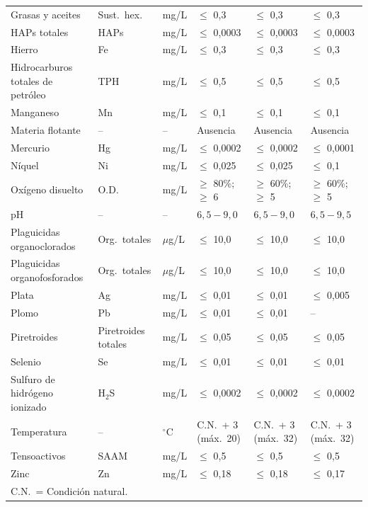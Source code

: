 \documentclass[12pt,a4paper]{article}
\begin{document}
\begin{longtable}{p{4.0cm}p{1.8cm}p{1.2cm}p{2.5cm}p{2.5cm}p{2.5cm}}
Grasas y aceites & Sust.\ hex. & mg/L & $\leq$ 0,3 & $\leq$ 0,3 & $\leq$ 0,3 \\
HAPs totales & HAPs & mg/L & $\leq$ 0,0003 & $\leq$ 0,0003 & $\leq$ 0,0003 \\
Hierro & Fe & mg/L & $\leq$ 0,3 & $\leq$ 0,3 & $\leq$ 0,3 \\
Hidrocarburos totales de petr\'oleo & TPH & mg/L & $\leq$ 0,5 & $\leq$ 0,5 & $\leq$ 0,5 \\
Manganeso & Mn & mg/L & $\leq$ 0,1 & $\leq$ 0,1 & $\leq$ 0,1 \\
Materia flotante & -- & -- & Ausencia & Ausencia & Ausencia \\
Mercurio & Hg & mg/L & $\leq$ 0,0002 & $\leq$ 0,0002 & $\leq$ 0,0001 \\
N\'iquel & Ni & mg/L & $\leq$ 0,025 & $\leq$ 0,025 & $\leq$ 0,1 \\
Ox\'igeno disuelto & O.D. & mg/L & $\geq$ 80\%; $\geq$ 6 & $\geq$ 60\%; $\geq$ 5 & $\geq$ 60\%; $\geq$ 5 \\
pH & -- & -- & $6,5 - 9,0$ & $6,5 - 9,0$ & $6,5 - 9,5$ \\
Plaguicidas organoclorados & Org.\ totales & $\mu$g/L & $\leq$ 10,0 & $\leq$ 10,0 & $\leq$ 10,0 \\
Plaguicidas organofosforados & Org.\ totales & $\mu$g/L & $\leq$ 10,0 & $\leq$ 10,0 & $\leq$ 10,0 \\
Plata & Ag & mg/L & $\leq$ 0,01 & $\leq$ 0,01 & $\leq$ 0,005 \\
Plomo & Pb & mg/L & $\leq$ 0,01 & $\leq$ 0,01 & -- \\
Piretroides & Piretroides totales & mg/L & $\leq$ 0,05 & $\leq$ 0,05 & $\leq$ 0,05 \\
Selenio & Se & mg/L & $\leq$ 0,01 & $\leq$ 0,01 & $\leq$ 0,01 \\
Sulfuro de hidr\'ogeno ionizado & H$_2$S & mg/L & $\leq$ 0,0002 & $\leq$ 0,0002 & $\leq$ 0,0002 \\
Temperatura & -- & $^\circ$C & C.N.\ + 3 (m\'ax.\ 20) & C.N.\ + 3 (m\'ax.\ 32) & C.N.\ + 3 (m\'ax.\ 32) \\
Tensoactivos & SAAM & mg/L & $\leq$ 0,5 & $\leq$ 0,5 & $\leq$ 0,5 \\
Zinc & Zn & mg/L & $\leq$ 0,18 & $\leq$ 0,18 & $\leq$ 0,17 \\
\multicolumn{6}{l}{\scriptsize C.N.~= Condici\'on natural.}\\
\end{longtable}
\normalsize

\end{document}
